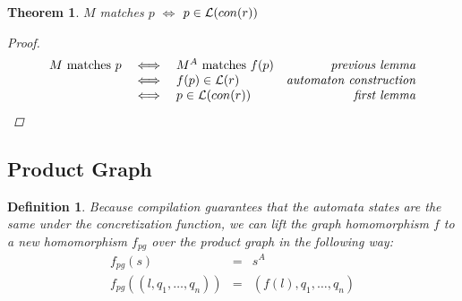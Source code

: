 \documentclass[twocolumn]{sig-alternate-10pt}
\newtheorem{thm}{Theorem}[section]
\newtheorem{defn}{Definition}
\begin{document}
\begin{thm}
  $M$ matches $p$ $\iff$ $p \in \mathcal{L}(con(r))$
  \begin{proof}
    \[ \begin{array}{lllr}
      M ~\text{matches}~ p &\iff& M^A ~\text{matches}~ f(p) & \textit{previous lemma} \\
                         &\iff& f(p) \in \mathcal{L}(r) & \textit{automaton construction} \\
                         &\iff& p \in \mathcal{L}(con(r)) & \textit{first lemma} \\
    \end{array} \]

  \end{proof}
\end{thm}


\subsection{Product Graph}

\begin{defn}
  Because compilation guarantees that the automata states are the same under the concretization function, we can lift the graph homomorphism $f$ to a new homomorphism $f_{pg}$ over the product graph in the following way:
  \[ \begin{array}{rcl}
    f_{pg}( s ) & = & s^A  \\
    f_{pg}( (l,q_1,\ldots,q_n) ) & = & (f(l),q_1,\ldots,q_n) \\
  \end{array} \]
\end{defn}
\end{document}
